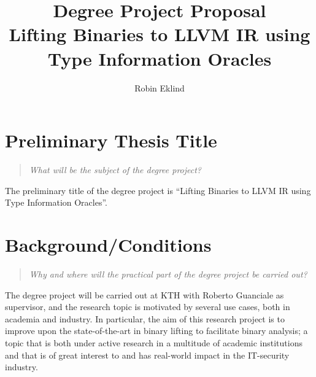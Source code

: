 \documentclass[12pt, a4paper]{article}
\title{Degree Project Proposal \\ \Large Lifting Binaries to LLVM IR using Type Information Oracles}
\author{Robin Eklind \\ }
\begin{document}



\maketitle

\clearpage


\tableofcontents

\clearpage



\section{Preliminary Thesis Title}

\begin{quote}
	\textit{What will be the subject of the degree project?}
\end{quote}


The preliminary title of the degree project is ``Lifting Binaries to LLVM IR using Type Information Oracles''.

\section{Background/Conditions}

\begin{quote}
	\textit{Why and where will the practical part of the degree project be carried out?}
\end{quote}

The degree project will be carried out at KTH with Roberto Guanciale as supervisor, and the research topic is motivated by several use cases, both in academia and industry. In particular, the aim of this research project is to improve upon the state-of-the-art in binary lifting to facilitate binary analysis; a topic that is both under active research in a multitude of academic institutions and that is of great interest to and has real-world impact in the IT-security industry.
\end{document}
